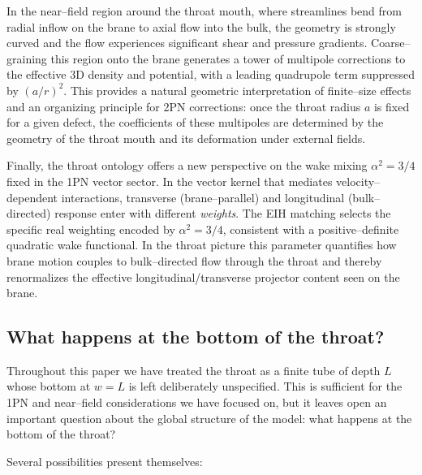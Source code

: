 \documentclass[12pt]{article}
\begin{document}
In the near--field region around the throat mouth, where streamlines bend
from radial inflow on the brane to axial flow into the bulk, the geometry is
strongly curved and the flow experiences significant shear and pressure
gradients.  Coarse--graining this region onto the brane generates a tower of
multipole corrections to the effective 3D density and potential, with a
leading quadrupole term suppressed by $(a/r)^2$.  This provides a natural
geometric interpretation of finite--size effects and an organizing principle
for 2PN corrections: once the throat radius $a$ is fixed for a given
defect, the coefficients of these multipoles are determined by the geometry
of the throat mouth and its deformation under external fields.

Finally, the throat ontology offers a new perspective on the wake mixing
$\alpha^2=3/4$ fixed in the 1PN vector sector.  In the vector kernel that
mediates velocity--dependent interactions, transverse (brane--parallel) and
longitudinal (bulk--directed) response enter with different \emph{weights}.
The EIH matching selects the specific real weighting encoded by
$\alpha^2=3/4$, consistent with a positive--definite quadratic wake
functional.  In the throat picture this parameter quantifies how brane motion
couples to bulk--directed flow through the throat and thereby renormalizes
the effective longitudinal/transverse projector content seen on the brane.

\subsection{What happens at the bottom of the throat?}
\label{subsec:bottom_throat}

Throughout this paper we have treated the throat as a finite tube of depth
$L$ whose bottom at $w=L$ is left deliberately unspecified.  This is
sufficient for the 1PN and near--field considerations we have focused on,
but it leaves open an important question about the global structure of the
model: what happens at the bottom of the throat?

Several possibilities present themselves:
\end{document}
